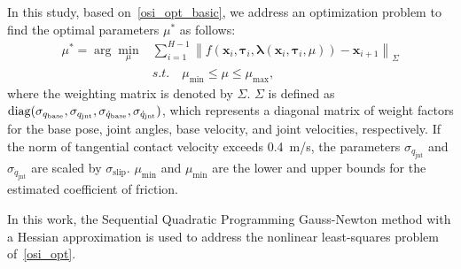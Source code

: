  In this study, based on~\eqref{osi_opt_basic}, we address an optimization problem to find the optimal parameters $\mu^{*}$ as follows:
\begin{equation}
    \begin{aligned}
\label{osi_opt}
     \mu^{*} = \arg\min_{\mu} &\sum_{i=1}^{H-1} \left\| {f}(\mathbf{x}_i,\boldsymbol{\tau}_i,\mathbf{\bm{\lambda}}(\mathbf{x}_i,\boldsymbol{\tau}_i,\mu)) - \mathbf{x}_{i+1} \right\|_{\Sigma}\\\quad  
      &s.t. \quad \mu_\mathrm{{min}} \leq \mu \leq \mu_\mathrm{max},
         \end{aligned}
 \end{equation}
 where the weighting matrix is denoted by $\Sigma$. $\Sigma$ is defined as $\mathrm{\operatorname{diag}}(\sigma_{q_\mathrm{base}},\sigma_{q_\mathrm{jnt}},\sigma_{\dot{q}_\mathrm{base}},\sigma_{\dot{q}_\mathrm{jnt}})$, which represents a diagonal matrix of weight factors for the base pose, joint angles, base velocity, and joint velocities, respectively. If the norm of tangential contact velocity exceeds 0.4~\si{\meter/\second}, the parameters $\sigma_{q_\mathrm{jnt}}$ and $\sigma_{\dot{q}_\mathrm{jnt}}$ are scaled by $\sigma_\mathrm{slip}$. $\mu_{\mathrm{min}}$ and $\mu_{\mathrm{min}}$ are the lower and upper bounds for the estimated coefficient of friction.
  
In this work, the Sequential Quadratic Programming Gauss-Newton method with a Hessian approximation is used to address the nonlinear least-squares problem of~\eqref{osi_opt}. 






